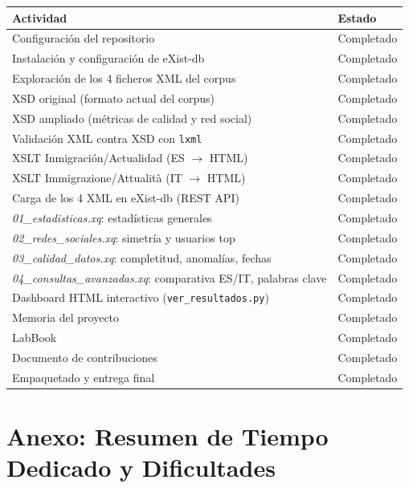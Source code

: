 \documentclass[11pt,a4paper]{article}
\begin{document}
\begin{center}
\begin{tabular}{L{11cm} C{3.5cm}}
\toprule
\textbf{Actividad} & \textbf{Estado} \\
\midrule
Configuración del repositorio & Completado \\
Instalación y configuración de eXist-db & Completado \\
Exploración de los 4 ficheros XML del corpus & Completado \\
XSD original (formato actual del corpus) & Completado \\
XSD ampliado (métricas de calidad y red social) & Completado \\
Validación XML contra XSD con \texttt{lxml} & Completado \\
XSLT Inmigración/Actualidad (ES $\to$ HTML) & Completado \\
XSLT Immigrazione/Attualità (IT $\to$ HTML) & Completado \\
Carga de los 4 XML en eXist-db (REST API) & Completado \\
\textit{01\_estadisticas.xq}: estadísticas generales & Completado \\
\textit{02\_redes\_sociales.xq}: simetría y usuarios top & Completado \\
\textit{03\_calidad\_datos.xq}: completitud, anomalías, fechas & Completado \\
\textit{04\_consultas\_avanzadas.xq}: comparativa ES/IT, palabras clave & Completado \\
Dashboard HTML interactivo (\texttt{ver\_resultados.py}) & Completado \\
Memoria del proyecto & Completado \\
LabBook & Completado \\
Documento de contribuciones & Completado \\
Empaquetado y entrega final & Completado \\
\bottomrule
\end{tabular}
\end{center}

\newpage

\section*{Anexo: Resumen de Tiempo Dedicado y Dificultades}
\end{document}
